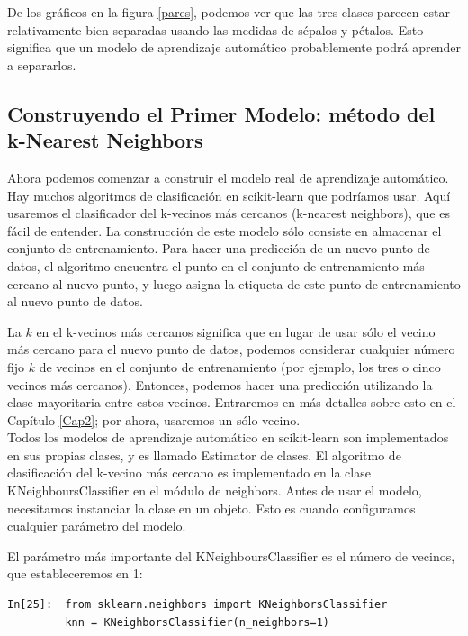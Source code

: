 De los gráficos en la figura \ref{pares}, podemos ver que las tres clases parecen estar relativamente bien separadas usando las medidas de sépalos y pétalos. Esto significa que un modelo de aprendizaje automático
probablemente podrá aprender a separarlos.



\subsection{Construyendo el Primer Modelo: método del k-Nearest Neighbors}

Ahora podemos comenzar a construir el modelo real de aprendizaje automático. Hay muchos algoritmos de clasificación en {\ttfamily scikit-learn}  que podríamos usar. Aquí usaremos el clasificador del k-vecinos más cercanos (k-nearest neighbors),  que es fácil de entender.   La construcción de este modelo sólo consiste en almacenar el conjunto de entrenamiento. Para hacer una predicción de un nuevo punto de datos, el algoritmo encuentra el punto en el conjunto de entrenamiento más cercano al nuevo punto, y luego asigna la etiqueta de este punto de entrenamiento al nuevo punto de datos.

La $k$ en el  k-vecinos más cercanos significa que en lugar de usar sólo el vecino más cercano
para el nuevo punto de datos, podemos considerar cualquier número fijo $k$ de vecinos en el conjunto de entrenamiento (por ejemplo, los tres o cinco vecinos más cercanos). Entonces, podemos hacer una predicción
utilizando la clase mayoritaria entre estos vecinos. Entraremos en más detalles sobre
esto en el Capítulo \ref{Cap2}; por ahora, usaremos un sólo vecino.\\


Todos los modelos de aprendizaje automático en {\ttfamily scikit-learn} son implementados en sus propias clases, y es llamado   {\ttfamily Estimator} de clases.  El algoritmo de clasificación del k-vecino más cercano es implementado en la clase  {\ttfamily KNeighboursClassifier}  en el módulo de {\ttfamily neighbors}.  Antes de usar el modelo, necesitamos instanciar la clase en un objeto. Esto es cuando configuramos cualquier parámetro del modelo. 

El parámetro más importante  del  {\ttfamily KNeighboursClassifier}  es el número de vecinos, que estableceremos en 1:\\

\begin{lstlisting}
In[25]:  from sklearn.neighbors import KNeighborsClassifier
         knn = KNeighborsClassifier(n_neighbors=1)

\end{lstlisting}


